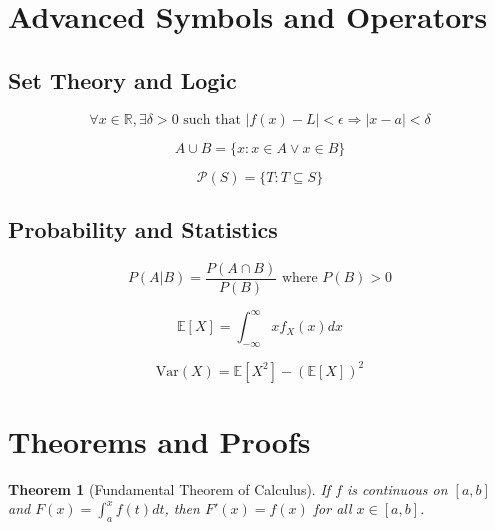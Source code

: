 \documentclass[11pt]{article}
\newtheorem{theorem}{Theorem}
\begin{document}
\section{Advanced Symbols and Operators}

\subsection{Set Theory and Logic}
\begin{equation}
\forall x \in \mathbb{R}, \exists \delta > 0 \text{ such that } |f(x) - L| < \epsilon \Rightarrow |x - a| < \delta
\end{equation}

\begin{equation}
A \cup B = \{x : x \in A \vee x \in B\}
\end{equation}

\begin{equation}
\mathcal{P}(S) = \{T : T \subseteq S\}
\end{equation}

\subsection{Probability and Statistics}
\begin{equation}
P(A|B) = \frac{P(A \cap B)}{P(B)} \text{ where } P(B) > 0
\end{equation}

\begin{equation}
\mathbb{E}[X] = \int_{-\infty}^{\infty} x f_X(x) dx
\end{equation}

\begin{equation}
\text{Var}(X) = \mathbb{E}[X^2] - (\mathbb{E}[X])^2
\end{equation}

\section{Theorems and Proofs}

\begin{theorem}[Fundamental Theorem of Calculus]
If $f$ is continuous on $[a,b]$ and $F(x) = \int_a^x f(t) dt$, then $F'(x) = f(x)$ for all $x \in [a,b]$.
\end{theorem}
\end{document}
